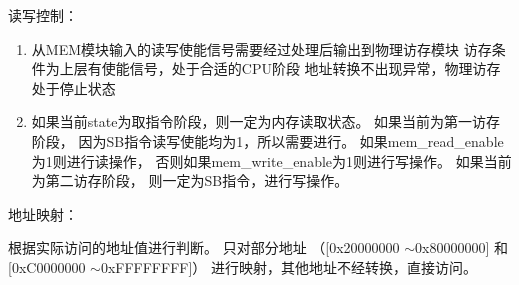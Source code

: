            读写控制：%
            \begin{minipage}[t]{0.8\linewidth}
                \begin{enumerate}
                \item
                    从MEM模块输入的读写使能信号需要经过处理后输出到物理访存模块%
                    访存条件为上层有使能信号，处于合适的CPU阶段%
                    地址转换不出现异常，物理访存处于停止状态%
                \item
                    如果当前state为取指令阶段，则一定为内存读取状态。%
                    如果当前为第一访存阶段，%
                        因为SB指令读写使能均为1，所以需要进行。%
                        如果mem\_read\_enable为1则进行读操作，%
                        否则如果mem\_write\_enable为1则进行写操作。%
                    如果当前为第二访存阶段，%
                        则一定为SB指令，进行写操作。%
                \end{enumerate}
            \end{minipage}
            
            地址映射：%
            \begin{minipage}[t]{0.8\linewidth}
                根据实际访问的地址值进行判断。%
                只对部分地址%
                （[0x20000000 $\sim$0x80000000]%
                和%
                [0xC0000000 $\sim$0xFFFFFFFF]）%
                进行映射，其他地址不经转换，直接访问。%
            \end{minipage}
            

